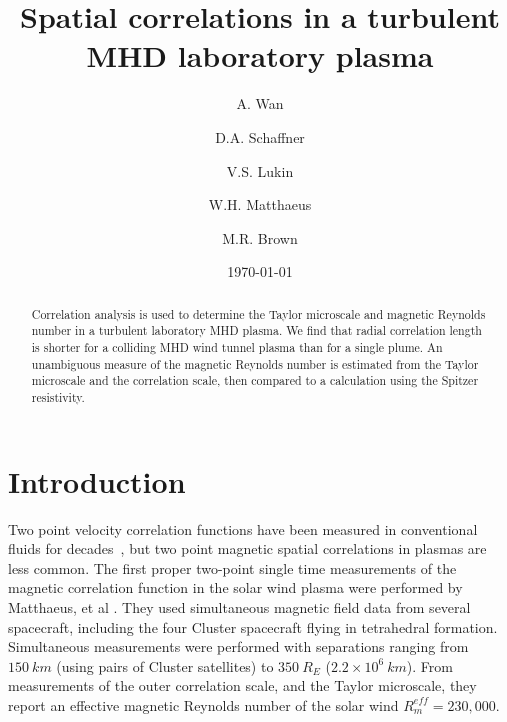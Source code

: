 \documentclass[aip,prl,amsmath,amssymb,reprint,superscriptaddress]{revtex4-1} %
\begin{document}
\title{Spatial correlations in a turbulent MHD laboratory plasma}

\author{A. Wan}
\author{D.A. Schaffner}
\author{V.S. Lukin}
\author{W.H. Matthaeus}
\author{M.R. Brown}
\date{\today}
\begin{abstract}
Correlation analysis is used to determine the Taylor microscale and magnetic Reynolds number in a turbulent laboratory MHD plasma.  We find that radial correlation length is shorter for a colliding MHD wind tunnel plasma than for a single plume.  An unambiguous measure of the magnetic Reynolds number is estimated from the Taylor microscale and the correlation scale, then compared to a calculation using the Spitzer resistivity.
\end{abstract}

\maketitle

\section{Introduction}



Two point velocity correlation functions have been measured in conventional fluids for decades~\cite{frisch95,Belmabrouk98}, but two point magnetic spatial correlations in plasmas are less common.  The first proper two-point single time measurements of the magnetic correlation function in the solar wind plasma were performed by Matthaeus, et al \cite{Matthaeus05}.  They used simultaneous magnetic field data from several spacecraft, including the four Cluster spacecraft flying in tetrahedral formation.  Simultaneous measurements were performed with separations ranging from $150~km$ (using pairs of Cluster satellites) to $350~R_E$ ($2.2 \times 10^6~km$).  From measurements of the outer correlation scale, and the Taylor microscale, they report an effective magnetic Reynolds number of the solar wind $R_m^{eff}  = 230,000$.
\end{document}
